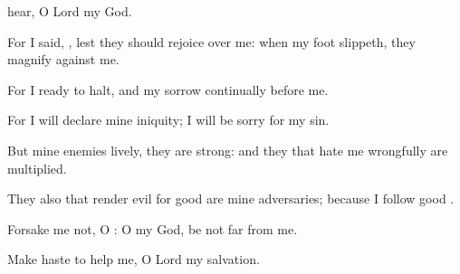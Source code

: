 {hear, O
Lord my
God.
\par }{\Q {}For I
said,
{}, lest
{} they should
rejoice over me: when my
foot
slippeth, they
magnify
{} against me.
\par }{\Q {}For I
{}
ready to
halt, and my
sorrow
{}
continually before me.
\par }{\Q {}For I will
declare mine
iniquity; I will be
sorry for my
sin.
\par }{\Q {}But mine
enemies
{}
lively,
{} they are
strong: and they that
hate me
wrongfully are
multiplied.
\par }{\Q {}They also that
render
evil for
good are mine
adversaries; because I
follow
{}
good
{}.
\par }{\Q {}Forsake me not, O
{}: O my
God, be not
far from me.
\par }{\Q {}Make
haste to
help me, O
Lord my
salvation.

}

